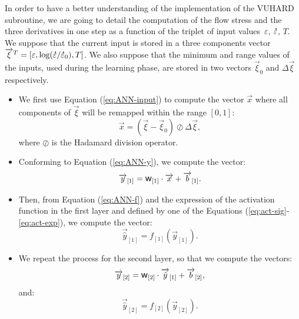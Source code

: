 \documentclass[algorithms,article,submit,pdftex,oneauthors]{Definitions/mdpi}
\DeclareRobustCommand{\w}{\mbox{\large\ensuremath{\mathsf{w}}}}
\DeclareRobustCommand{\lay}[1]{_{[#1]}}
\DeclareRobustCommand{\mdot}[1]{\accentset{\mbox{\bfseries .}}{#1}}
\begin{document}
\textcolor{greencolor}{In order to have a better understanding of the implementation of the VUHARD subroutine, we are going to detail the computation of the flow stress and the three derivatives in one step as a function of the triplet of input values~$\varepsilon$, $\mdot{\varepsilon}$, $T$.}
We suppose that the current input is stored in a three components vector $\overrightarrow{\xi}^T=\left[\varepsilon, \log(\mdot{\varepsilon}/\mdot{\varepsilon}_{0}), T\right]$.
We also suppose that the minimum and range values of the inputs, used during the learning phase, are stored in two vectors $\overrightarrow{\xi}_{0}$ and $\Delta\overrightarrow{\xi}$ respectively.
\begin{itemize}
\item We first use Equation (\ref{eq:ANN-input}) to compute the vector $\overrightarrow{x}$ where all components of $\overrightarrow{\xi}$ will be remapped within the range $[0,1]$:
\begin{equation}
\overrightarrow{x}=\left(\overrightarrow{\xi}-\overrightarrow{\xi}_{0}\right)\oslash\Delta\overrightarrow{\xi}, \label{eq:ANNi1}
\end{equation}
where $\oslash$ is the Hadamard division operator.
\item Conforming to Equation (\ref{eq:ANN-y}), we compute the vector:
\begin{equation}
\overrightarrow{y}\lay{1}=\w\lay{1}\cdot\overrightarrow{x}+\overrightarrow{b}\lay{1}.\label{eq:ANNi2}
\end{equation}
\item Then, from Equation (\ref{eq:ANN-f}) and the expression of the activation function in the first layer and defined by one of the Equations (\ref{eq:act-sig}-\ref{eq:act-exp}), we compute the vector:
\begin{equation}
\overrightarrow{\hat{y}}\lay{1}=f\lay{1}(\overrightarrow{y}\lay{1}).\label{eq:ANNi3}
\end{equation}
\item We repeat the process for the second layer, so that we compute the vectors: \begin{equation}
\overrightarrow{y}\lay{2}=\w\lay{2}\cdot\overrightarrow{\hat{y}}\lay{1}+\overrightarrow{b}\lay{2},\label{eq:ANNi4}
\end{equation}
and:
\begin{equation}
\overrightarrow{\hat{y}}\lay{2}=f\lay{2}(\overrightarrow{y}\lay{2}).\label{eq:ANNi5}

\end{equation}
\end{itemize}
\end{document}
